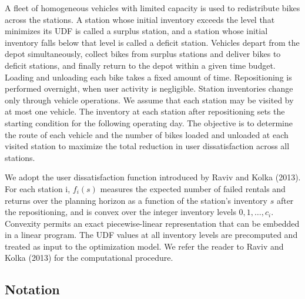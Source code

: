 \documentclass[11pt]{article}
\numberwithin{table}{section}
\numberwithin{figure}{section}
\begin{document}
A fleet of homogeneous vehicles with limited capacity is used to redistribute bikes across the stations. A station whose initial inventory exceeds the level that minimizes its UDF is called a surplus station, and a station whose initial inventory falls below that level is called a deficit station. Vehicles depart from the depot simultaneously, collect bikes from surplus stations and deliver bikes to deficit stations, and finally return to the depot within a given time budget. Loading and unloading each bike takes a fixed amount of time. Repositioning is performed overnight, when user activity is negligible. Station inventories change only through vehicle operations. We assume that each station may be visited by at most one vehicle. The inventory at each station after repositioning sets the starting condition for the following operating day. The objective is to determine the route of each vehicle and the number of bikes loaded and unloaded at each visited station to maximize the total reduction in user dissatisfaction across all stations.

We adopt the user dissatisfaction function introduced by Raviv and Kolka (2013). For each station i, ${{f}_{i}}\left( s \right)$ measures the expected number of failed rentals and returns over the planning horizon as a function of the station’s inventory $s$ after the repositioning, and is convex over the integer inventory levels $0,1,\ldots ,{{c}_{i}}$. Convexity permits an exact piecewise-linear representation that can be embedded in a linear program. The UDF values at all inventory levels are precomputed and treated as input to the optimization model. We refer the reader to Raviv and Kolka (2013) for the computational procedure.

\subsection{Notation}
\end{document}
